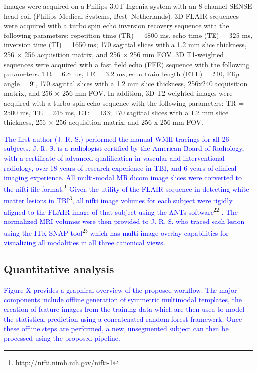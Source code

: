 \documentclass[11pt,]{article}
\let\rmarkdownfootnote\footnote%
\def\footnote{\protect\rmarkdownfootnote}
\begin{document}
Images were acquired on a Philips 3.0T Ingenia system with an 8-channel
SENSE head coil (Philips Medical Systems, Best, Netherlands). 3D FLAIR
sequences were acquired with a turbo spin echo inversion recovery
sequence with the following parameters: repetition time (TR) = 4800 ms,
echo time (TE) = 325 ms, inversion time (TI) = 1650 ms; 170 sagittal
slices with a 1.2 mm slice thickness, 256 \(\times\) 256 acquisition
matrix, and 256 \(\times\) 256 mm FOV. 3D T1-weighted sequences were
acquired with a fast field echo (FFE) sequence with the following
parameters: TR = 6.8 ms, TE = 3.2 ms, echo train length (ETL) = 240;
Flip angle = 9\(^\circ\), 170 sagittal slices with a 1.2 mm slice
thickness, 256x240 acquisition matrix, and 256 \(\times\) 256 mm FOV. In
addition, 3D T2-weighted images were acquired with a turbo spin echo
sequence with the following parameters: TR = 2500 ms, TE = 245 ms, ET: =
133; 170 sagittal slices with a 1.2 mm slice thickness, 256 \(\times\)
256 acquisition matrix, and 256 x 256 mm FOV.

\textcolor{blue}{The first author (J. R. S.) performed the manual WMH tracings for all 26
subjects.  J. R. S. is a radiologist certified by the American Board of Radiology, with a certificate of advanced qualification in vascular and interventional radiology, over 18 years of research experience in TBI, and 6 years of clinical imaging experience.  All
multi-modal MR dicom image slices were converted to the nifti file format}.\footnote{\url{http://nifti.nimh.nih.gov/nifti-1}}
\textcolor{blue}{Given the
utility of the FLAIR sequence in detecting white matter lesions in TBI}\textsuperscript{3}\textcolor{blue}{, all nifti image volumes for each subject were rigidly aligned to the FLAIR image of that subject using the ANTs software}\textsuperscript{22}
\textcolor{blue}{.  The normalized MRI volumes were then provided to
J. R. S. who traced each lesion using the ITK-SNAP tool}\textsuperscript{23}
\textcolor{blue}{
which has multi-image overlay capabilities for visualizing all modalities in all three
canonical views.}

\subsection{Quantitative analysis}\label{quantitative-analysis}

\textcolor{blue}{Figure X provides a graphical overview of the proposed workflow.  The major components
include offline generation of symmetric multimodal templates, the creation of
feature images from the training data which are then used to model the statistical
prediction using a concatenated random forest framework.  Once these offline steps
are performed, a new, unsegmented subject can then be processed using the proposed pipeline.}
\end{document}
